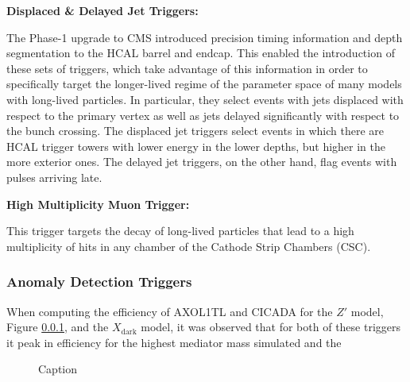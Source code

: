 




\noindent\textbf{Displaced \& Delayed Jet Triggers:}

The Phase-1 upgrade to CMS introduced precision timing information and depth segmentation to the HCAL barrel and endcap. This enabled the introduction of these sets of triggers, which take advantage of this information in order to specifically target the longer-lived regime of the parameter space of many models with long-lived particles. In particular, they select events with jets displaced with respect to the primary vertex as well as jets delayed significantly with respect to the bunch crossing. The displaced jet triggers select events in which there are HCAL trigger towers with lower energy in the lower depths, but higher in the more exterior ones. The delayed jet triggers, on the other hand, flag events with pulses arriving late.

\noindent\textbf{High Multiplicity Muon Trigger:}

This trigger targets the decay of long-lived particles that lead to a high multiplicity of hits in any chamber of the Cathode Strip Chambers (CSC).

\subsubsection{Anomaly Detection Triggers}


% 



When computing the efficiency of AXOL1TL and CICADA for the $Z'$ model, Figure \ref{}, and the $X_{\text{dark}}$ model, it was observed that for both of these triggers it peak in efficiency for the highest mediator mass simulated and the 

\begin{figure}
    \centering
    
    \caption{Caption}
    \label{fig:enter-label}
\end{figure}



